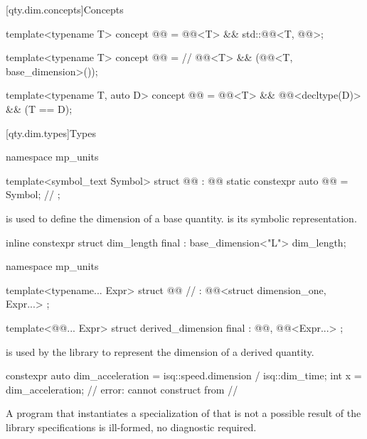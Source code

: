 [qty.dim.concepts]{Concepts}

\begin{itemdecl}
template<typename T>
concept @@ = @@<T> && std::@@<T, @@>;

template<typename T>
concept @@ =  // \expos
  @@<T> && (@@<T, base_dimension>());

template<typename T, auto D>
concept @@ = @@<T> && @@<decltype(D)> && (T{} == D);
\end{itemdecl}

[qty.dim.types]{Types}

\begin{codeblock}
namespace mp_units {

template<symbol_text Symbol>
struct @@ : @@ {
  static constexpr auto @@ = Symbol;  // \expos
};

}
\end{codeblock}

\pnum
{} is used
to define the dimension of a base quantity.
 is its symbolic representation.
\begin{example}
\begin{codeblock}
inline constexpr struct dim_length final : base_dimension<"L"> {} dim_length;
\end{codeblock}
\end{example}

\begin{codeblock}
namespace mp_units {

template<typename... Expr>
struct @@  // \expos
    : @@<struct dimension_one, Expr...> {};

template<@@... Expr>
struct derived_dimension final : @@, @@<Expr...> {};

}
\end{codeblock}

\pnum
{} is used by the library
to represent the dimension of a derived quantity.
\begin{example}
\begin{codeblock}
constexpr auto dim_acceleration = isq::speed.dimension / isq::dim_time;
int x = dim_acceleration;  // error: cannot construct from
  // 
\end{codeblock}
\end{example}
A program that instantiates a specialization of 
that is not a possible result of the library specifications
is ill-formed, no diagnostic required.

